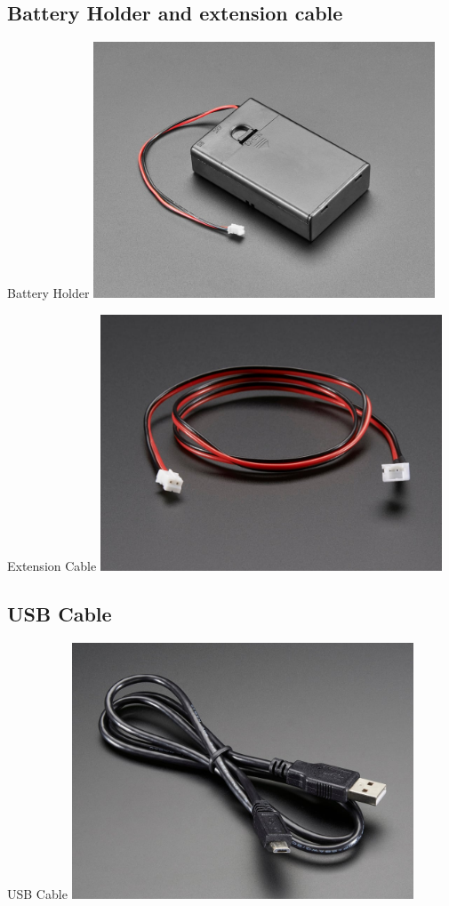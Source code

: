 \documentclass{beamer}
\begin{document}
\subsection{Battery Holder and extension cable}
\begin{frame}[fragile]{Battery Holder}
\includegraphics[height=3in]{BatteryHolder.jpg}
\end{frame}
\begin{frame}[fragile]{Extension Cable}
\includegraphics[height=3in]{ExtenssionCable.jpg}
\end{frame}
\subsection{USB Cable}
\begin{frame}[fragile]{USB Cable}
\includegraphics[width=4in]{USBCable.jpg}
\end{frame}
\end{document}
